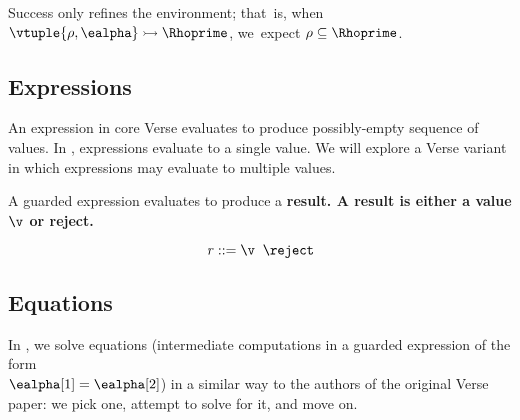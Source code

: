 \documentclass[]{article}
\begin{document}
    \medskip
    

    
    
    
    
    Success only refines the environment; that~is, when
    ${\vtuple{\rho, \ealpha}} \rightarrowtail{} {\Rhoprime}$, we~expect $\rho \subseteq \Rhoprime$.
    
    

    
    \subsection{Expressions}
    
    \newcommand\GNoTree{\vmrung \rightsquigarrow \uppsidown} 
    
    An expression in core Verse evaluates to produce possibly-empty sequence of
    values. In {\VMinus}, expressions evaluate to a single value. We will explore
    a Verse variant in which expressions may evaluate to multiple values. 

    

    A guarded expression evaluates to produce a \bf{result}. A result is either
    a value $\v$ or reject. 
    
    \[\it{r}\; \rm{::=}\; \v\; \; \reject \]
    
    
    
    \bigskip
\subsection{Equations}

In {\VMinus}, we solve equations (intermediate computations in a guarded
expression of the form \\$\ealpha[1] = \ealpha[2]$) in a similar way to the
authors of the original Verse paper: we pick one, attempt to solve for it, and
move on. 
\end{document}
